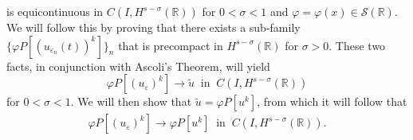\documentclass[12pt,reqno]{amsart}
\newcommand{\rr}{\mathbb{R}}
\newcommand{\ee}{\varepsilon}
\theoremstyle{plain}  %
\theoremstyle{definition}
\begin{document}
\begin{appendices}
\begin{equation*}
	\end{equation*}
		is equicontinuous in $C(I, H^{s-\sigma}(\rr))$ 
		for $0 < \sigma < 1$ and $\varphi = \varphi(x) \in \mathcal{S}(\rr)$.
		We will follow this by proving that
		there exists a sub-family $\{\varphi P[(u_{\ee_n}(t))^k]\}_n$
		that is precompact in $H^{s-\sigma}(\rr)$ for $\sigma > 0$. 
		These two facts, in conjunction with Ascoli's Theorem, will
		yield
		\begin{equation*}
			\label{hhstrong-conv2}
			\varphi P[(u_\ee)^k] \to \tilde{u}
			\; \; \text{in} \; \; C(I,H^{s-\sigma}(\rr))
		\end{equation*}
		for $0 < \sigma < 1$.
		We will then show that $\tilde{u} = \varphi P[u^k]$, from which it will
		follow that
		\begin{equation*}
			\label{hhphiplus}
			\begin{split}
				\varphi P[(u_\ee)^k] \to \varphi P[u^k]
				\; \; \text{in} \; \; C(I,H^{s-\sigma}(\rr)).
			\end{split}
		\end{equation*}
		



\end{appendices}
\end{document}
